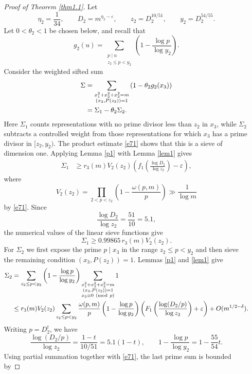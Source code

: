 \documentclass[12pt,a4paper,reqno]{amsart}
\numberwithin{equation}{section}
\def\pmod #1{\ ({\rm{mod}}\ #1)}
\theoremstyle{plain}
\theoremstyle{definition}
\begin{document}
\begin{proof}[Proof of Theorem \ref{thm1.1}]
Let
\[
\eta_2=\frac1{34},
\qquad
D_2=m^{\eta_2-\varepsilon},
\qquad
z_2=D_2^{10/51},
\qquad
y_2=D_2^{54/55}.
\]
Let $0<\theta_2<1$ be chosen below, and recall that
\[
g_2(u)=\sum_{\substack{p\mid u\\ z_2\leq p<y_2}}
\left(1-\frac{\log p}{\log y_2}\right).
\]
Consider the weighted sifted sum
\begin{align}\label{e15}
\Sigma
&=\sum_{\substack{x_1^2+x_2^2+x_3^2=m\\ (x_3,P(z_2))=1}}
\left(1-\theta_2g_2(x_3)\right) \notag\\
&=\Sigma_1-\theta_2\Sigma_2.
\end{align}
Here $\Sigma_1$ counts representations with no prime divisor less than $z_2$ in $x_3$, while $\Sigma_2$ subtracts a controlled weight from those representations for which $x_3$ has a prime divisor in $[z_2,y_2)$.
The product estimate \eqref{e71} shows that this is a sieve of dimension one. Applying Lemma \ref{p1} with Lemma \ref{lem1} gives
\begin{align}\label{e16}
\Sigma_1
&\geq
r_3(m)V_2(z_2)
\left(f_1\left(\frac{\log D_2}{\log z_2}\right)-\varepsilon\right),
\end{align}
where
\[
V_2(z_2)=\prod_{2<p<z_2}
\left(1-\frac{\omega(p,m)}p\right)
\gg\frac1{\log m}
\]
by \eqref{e71}. Since
\[
\frac{\log D_2}{\log z_2}=\frac{51}{10}=5.1,
\]
the numerical values of the linear sieve functions give
\begin{equation}\label{e16a}
\Sigma_1\geq0.99865\,r_3(m)V_2(z_2).
\end{equation}
For $\Sigma_2$ we first expose the prime $p\mid x_3$ in the range $z_2\leq p<y_2$ and then sieve the remaining condition $(x_3,P(z_2))=1$. Lemmas \ref{p1} and \ref{lem1} give
\begin{align}\label{e17}
\Sigma_2
&=\sum_{z_2\leq p<y_2}
\left(1-\frac{\log p}{\log y_2}\right)
\sum_{\substack{x_1^2+x_2^2+x_3^2=m\\ (x_3,P(z_2))=1\\ x_3\equiv0\pmod p}}1 \notag\\
&\leq
r_3(m)V_2(z_2)
\sum_{z_2\leq p<y_2}
\frac{\omega(p,m)}p
\left(1-\frac{\log p}{\log y_2}\right)
\left(F_1\left(\frac{\log(D_2/p)}{\log z_2}\right)+\varepsilon\right)+O(m^{1/2-\delta}).
\end{align}
Writing $p=D_2^t$, we have
\[
\frac{\log(D_2/p)}{\log z_2}=\frac{1-t}{10/51}=5.1(1-t),
\qquad
1-\frac{\log p}{\log y_2}=1-\frac{55}{54}t.
\]
Using partial summation together with \eqref{e71}, the last prime sum is bounded by

\end{proof}
\end{document}
